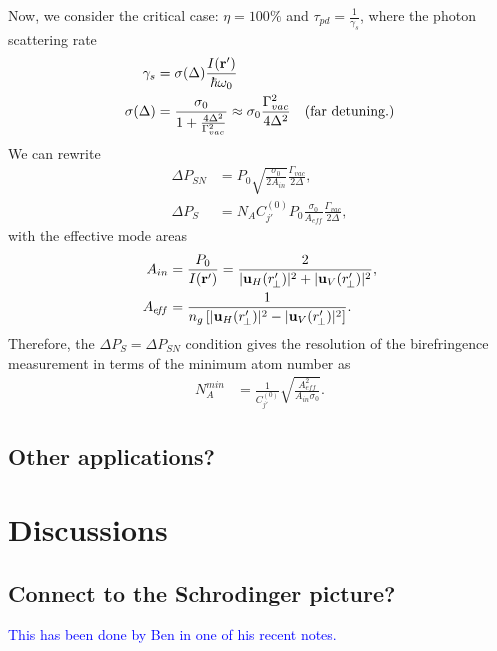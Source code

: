 \documentclass[preprint,aps,pra,onecolumn]{revtex4-1} %
\begin{document}
Now, we consider the critical case: $\eta =100\%$ and $\tau_{pd} = \frac{1}{\gamma_s}$, where the photon scattering rate
\begin{align}
\gamma_s &= \sigma(\Delta) \frac{I(\mathbf{r}')}{\hbar \omega_0} \\
\sigma(\Delta) &=\frac{\sigma_0}{1+\frac{4\Delta^2}{\Gamma^2_{vac}}}\approx \sigma_0 \frac{\Gamma_{vac}^2}{4\Delta^2} \quad \text{(far detuning.)}
\end{align}
We can rewrite 
\begin{align}
\Delta P_{SN} &=P_0\sqrt{\frac{ \sigma_0 }{2A_{in}}}\frac{\Gamma_{vac}}{2\Delta},\\
\Delta P_S &= N_A C_{j'}^{(0)}P_0 \frac{\sigma_0}{A_{e\!f\!f}}\frac{\Gamma_{vac}}{2\Delta}, 
\end{align}
with the effective mode areas
\begin{align}
A_{in } &= \frac{P_0}{I(\mathbf{r}')}=\frac{2}{| \mathbf{u}_H(r'_{\!\perp})|^2+ | \mathbf{u}_V(r'_{\!\perp})|^2},\\
A_{e\!f\!f} &= \frac{1}{n_g\left[ | \mathbf{u}_H(r'_{\!\perp})|^2- | \mathbf{u}_V(r'_{\!\perp})|^2\right]}.
\end{align}
Therefore, the $ \Delta P_S = \Delta P_{SN}$ condition gives the resolution of the birefringence measurement in terms of the minimum atom number as
\begin{align}
N^{min}_A &= \frac{1}{C_{j'}^{(0)}}\sqrt{\frac{A_{e\!f\!f}^2}{A_{in}\sigma_0}}.
\end{align}

\subsection{Other applications?} 


\section{Discussions}



\subsection{Connect to the Schrodinger picture?}
\textcolor{blue}{This has been done by Ben in one of his recent notes. }



\end{document}
